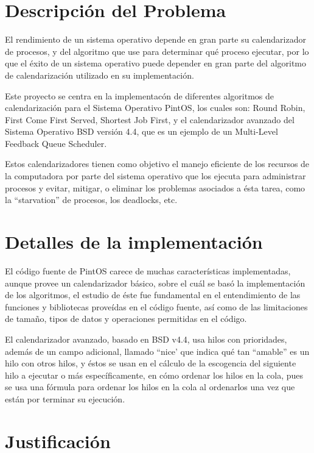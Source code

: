 \documentclass[letterpaper,journal,12pt]{IEEEtran}
\begin{document}
\section{Descripción del Problema}

El rendimiento de un sistema operativo depende en gran parte su calendarizador de procesos, y del algoritmo
que use para determinar qué proceso ejecutar, por lo que el éxito de un sistema operativo puede depender
en gran parte del algoritmo de calendarización utilizado en su implementación.

Este proyecto se centra en la implementacón de diferentes algoritmos de calendarización para el Sistema Operativo
PintOS, los cuales son: Round Robin, First Come First Served, Shortest Job First, y el calendarizador avanzado del
Sistema Operativo BSD versión 4.4, que es un ejemplo de un Multi-Level Feedback Queue Scheduler.

Estos calendarizadores tienen como objetivo el manejo eficiente de los recursos
de la computadora por parte del sistema operativo que los ejecuta para administrar
procesos y evitar, mitigar, o eliminar los problemas asociados a ésta tarea, como la ``starvation'' de procesos, los deadlocks, etc.

\section{Detalles de la implementación}

El código fuente de PintOS carece de muchas características implementadas, aunque provee un calendarizador básico,
sobre el cuál se basó la implementación de los algoritmos, el estudio de éste fue fundamental en el entendimiento
de las funciones y bibliotecas proveídas en el código fuente, así como de las limitaciones de tamaño, tipos de datos
y operaciones permitidas en el código.\newline

El calendarizador avanzado, basado en BSD v4.4, usa hilos con prioridades, además de un campo adicional, llamado ``nice'
que indica qué tan ``amable'' es un hilo con otros hilos, y éstos se usan en el cálculo de la escogencia del siguiente hilo a ejecutar
o más específicamente, en cómo ordenar los hilos en la cola, pues se usa una fórmula para ordenar los hilos en la cola al ordenarlos
una vez que están por terminar su ejecución.

\section{Justificación}
\end{document}
